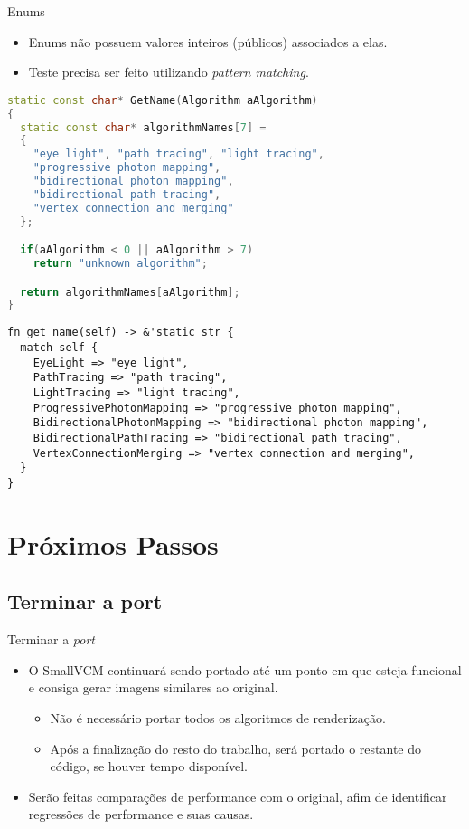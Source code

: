 \documentclass{beamer}
\begin{document}
\begin{frame}[fragile]{Enums}
	\begin{itemize}
		\item Enums não possuem valores inteiros (públicos) associados a elas.
		\item Teste precisa ser feito utilizando \emph{pattern matching}.
	\end{itemize}
	\begin{overprint}
	\begin{lstlisting}[language=C++]
static const char* GetName(Algorithm aAlgorithm)
{
  static const char* algorithmNames[7] =
  {
    "eye light", "path tracing", "light tracing",
    "progressive photon mapping",
    "bidirectional photon mapping",
    "bidirectional path tracing",
    "vertex connection and merging"
  };

  if(aAlgorithm < 0 || aAlgorithm > 7)
    return "unknown algorithm";

  return algorithmNames[aAlgorithm];
}
	\end{lstlisting}
	
	\begin{lstlisting}
fn get_name(self) -> &'static str {
  match self {
    EyeLight => "eye light",
    PathTracing => "path tracing",
    LightTracing => "light tracing",
    ProgressivePhotonMapping => "progressive photon mapping",
    BidirectionalPhotonMapping => "bidirectional photon mapping",
    BidirectionalPathTracing => "bidirectional path tracing",
    VertexConnectionMerging => "vertex connection and merging",
  }
}
	\end{lstlisting}
	\end{overprint}
\end{frame}

\section{Próximos Passos}
\subsection{Terminar a port}
\begin{frame}{Terminar a \emph{port}}
	\begin{itemize}
		\item O SmallVCM continuará sendo portado até um ponto em que esteja funcional e consiga gerar imagens similares ao original.
		\begin{itemize}
			\item Não é necessário portar todos os algoritmos de renderização.
			\item Após a finalização do resto do trabalho, será portado o restante do código, se houver tempo disponível.
		\end{itemize}
		\item Serão feitas comparações de performance com o original, afim de identificar regressões de performance e suas causas.
	\end{itemize}
\end{frame}
\end{document}
